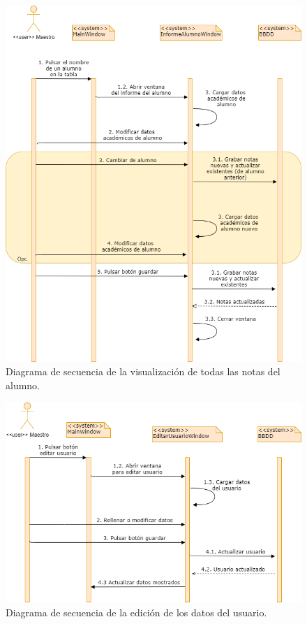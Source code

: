 \begin{figure}[h]
\centering\includegraphics[width=1\linewidth]{figs/dia_informealumno.png}
\caption{Diagrama de secuencia de la visualización de todas las notas del alumno.}
\label{Fig:dia_informealumno}
\end{figure}

\begin{figure}[h]
\centering\includegraphics[width=1\linewidth]{figs/dia_editarusuario.png}
\caption{Diagrama de secuencia de la edición de los datos del usuario.}
\label{Fig:dia_editarusuario}
\end{figure}

